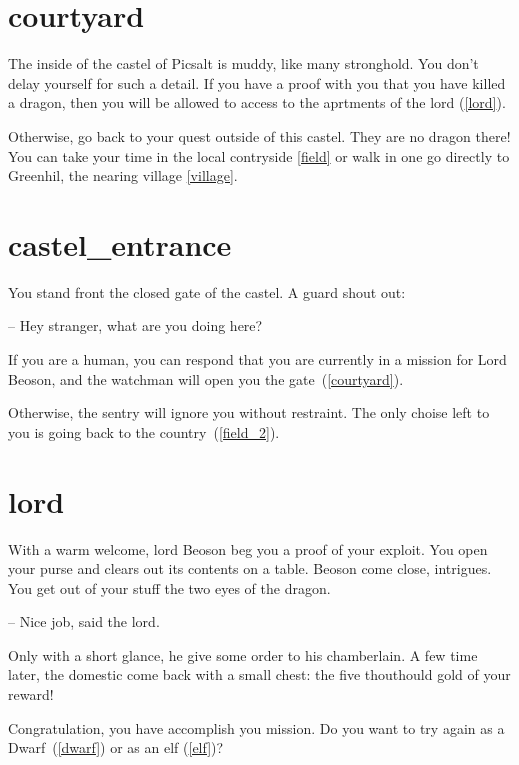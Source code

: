 \section{courtyard}

The inside of the castel of Picsalt is muddy, like many stronghold. You don't
delay yourself for such a detail. If you have a proof with you that you have
killed a dragon, then you will be allowed to access to the aprtments of the lord
(\ref{lord}).

Otherwise, go back to your quest outside of this castel. They are no dragon
there! You can take your time in the local contryside \ref{field} or walk in
one go directly to Greenhil, the nearing village \ref{village}.

\section{castel_entrance}

You stand front the closed gate of the castel. A guard shout out:

-- Hey stranger, what are you doing here?

If you are a human, you can respond that you are currently in a mission for Lord
Beoson, and the watchman will open you the gate~(\ref{courtyard}).

Otherwise, the sentry will ignore you without restraint. The only choise
left to you is going back to the country~(\ref{field_2}).

\section{lord}

With a warm welcome, lord Beoson beg you a proof of your exploit.  You open
your purse and clears out its contents on a table. Beoson come close,
intrigues. You get out of your stuff the two eyes of the dragon.

-- Nice job, said the lord.

Only with a short glance, he give some order to his chamberlain. A few time
later, the domestic come back with a small chest: the five thouthould gold of
your reward!

\medbreak

Congratulation, you have accomplish you mission. Do you want to try again as a
Dwarf~(\ref{dwarf}) or as an elf (\ref{elf})?
